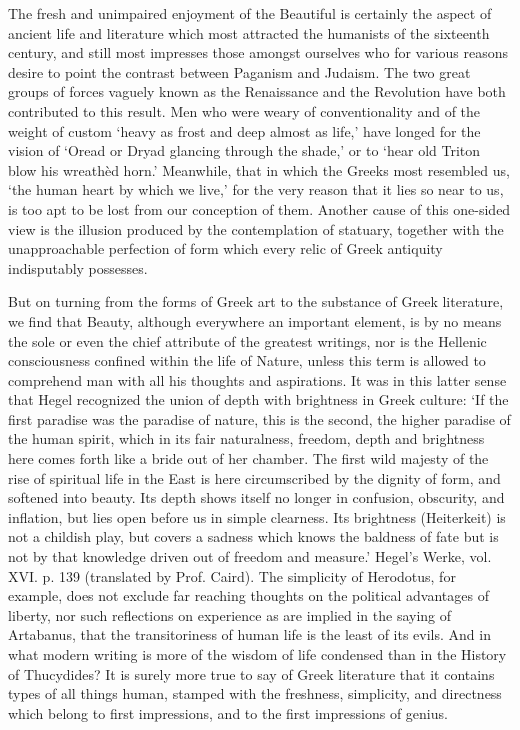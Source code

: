 \documentclass[11pt,letter]{book}
\begin{document}
\par  The fresh and unimpaired enjoyment of the Beautiful is certainly the aspect of ancient life and literature which most attracted the humanists of the sixteenth century, and still most impresses those amongst ourselves who for various reasons desire to point the contrast between Paganism and Judaism. The two great groups of forces vaguely known as the Renaissance and the Revolution have both contributed to this result. Men who were weary of conventionality and of the weight of custom ‘heavy as frost and deep almost as life,’ have longed for the vision of ‘Oread or Dryad glancing through the shade,’ or to ‘hear old Triton blow his wreathèd horn.’ Meanwhile, that in which the Greeks most resembled us, ‘the human heart by which we live,’ for the very reason that it lies so near to us, is too apt to be lost from our conception of them. Another cause of this one-sided view is the illusion produced by the contemplation of statuary, together with the unapproachable perfection of form which every relic of Greek antiquity indisputably possesses.

\par  [page xiv] But on turning from the forms of Greek art to the substance of Greek literature, we find that Beauty, although everywhere an important element, is by no means the sole or even the chief attribute of the greatest writings, nor is the Hellenic consciousness confined within the life of Nature, unless this term is allowed to comprehend man with all his thoughts and aspirations. It was in this latter sense that Hegel recognized the union of depth with brightness in Greek culture: ‘If the first paradise was the paradise of nature, this is the second, the higher paradise of the human spirit, which in its fair naturalness, freedom, depth and brightness here comes forth like a bride out of her chamber. The first wild majesty of the rise of spiritual life in the East is here circumscribed by the dignity of form, and softened into beauty. Its depth shows itself no longer in confusion, obscurity, and inflation, but lies open before us in simple clearness. Its brightness (Heiterkeit) is not a childish play, but covers a sadness which knows the baldness of fate but is not by that knowledge driven out of freedom and measure.’ Hegel’s Werke, vol. XVI. p. 139 (translated by Prof. Caird). The simplicity of Herodotus, for example, does not exclude far reaching thoughts on the political advantages of liberty, nor such reflections on experience as are implied in the saying of Artabanus, that the transitoriness of human life is the least of its evils. And in what modern writing is more of the wisdom of life condensed than in the History of Thucydides? It is surely more true to say of Greek literature that it contains types of all things human, stamped with the freshness, simplicity, and directness which belong to first impressions, and to the first impressions of genius.
\end{document}
